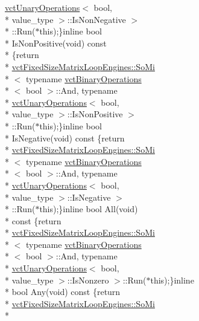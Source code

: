 \begin{DoxyCompactItemize}
\hyperlink{classvct_unary_operations}{vct\-Unary\-Operations}$<$ bool, \\*
value\-\_\-type $>$\-::Is\-Non\-Negative $>$\\*
\-::Run($\ast$this);\}inline bool \\*
Is\-Non\-Positive(void) const \\*
\{return \\*
\hyperlink{classvct_fixed_size_matrix_loop_engines_1_1_so_mi}{vct\-Fixed\-Size\-Matrix\-Loop\-Engines\-::\-So\-Mi}\\*
$<$ typename \hyperlink{classvct_binary_operations}{vct\-Binary\-Operations}\\*
$<$ bool $>$\-::And, typename \\*
\hyperlink{classvct_unary_operations}{vct\-Unary\-Operations}$<$ bool, \\*
value\-\_\-type $>$\-::Is\-Non\-Positive $>$\\*
\-::Run($\ast$this);\}inline bool \\*
Is\-Negative(void) const \{return \\*
\hyperlink{classvct_fixed_size_matrix_loop_engines_1_1_so_mi}{vct\-Fixed\-Size\-Matrix\-Loop\-Engines\-::\-So\-Mi}\\*
$<$ typename \hyperlink{classvct_binary_operations}{vct\-Binary\-Operations}\\*
$<$ bool $>$\-::And, typename \\*
\hyperlink{classvct_unary_operations}{vct\-Unary\-Operations}$<$ bool, \\*
value\-\_\-type $>$\-::Is\-Negative $>$\\*
\-::Run($\ast$this);\}inline bool All(void) \\*
const \{return \\*
\hyperlink{classvct_fixed_size_matrix_loop_engines_1_1_so_mi}{vct\-Fixed\-Size\-Matrix\-Loop\-Engines\-::\-So\-Mi}\\*
$<$ typename \hyperlink{classvct_binary_operations}{vct\-Binary\-Operations}\\*
$<$ bool $>$\-::And, typename \\*
\hyperlink{classvct_unary_operations}{vct\-Unary\-Operations}$<$ bool, \\*
value\-\_\-type $>$\-::Is\-Nonzero $>$\-::Run($\ast$this);\}inline \\*
bool Any(void) const \{return \\*
\hyperlink{classvct_fixed_size_matrix_loop_engines_1_1_so_mi}{vct\-Fixed\-Size\-Matrix\-Loop\-Engines\-::\-So\-Mi}\\*

\end{DoxyCompactItemize}
